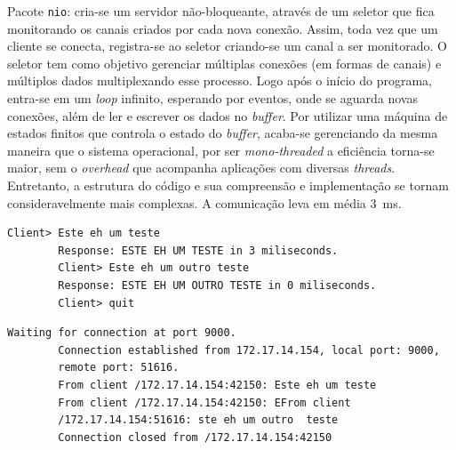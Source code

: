 \documentclass[a4paper, 12pt, answers]{exam}
\begin{document}
\begin{questions}
\begin{parts}
\begin{solution}
        Pacote \verb|nio|: cria-se um servidor não-bloqueante, através de um seletor 
        que fica monitorando os canais criados por cada nova conexão. Assim, toda vez
        que um cliente se conecta, registra-se ao seletor criando-se um canal a ser
        monitorado. O seletor tem como objetivo gerenciar múltiplas conexões (em 
        formas de canais) e múltiplos dados multiplexando esse processo.
        Logo após o início do programa, entra-se em um \emph{loop} infinito, 
        esperando por eventos, onde se aguarda novas conexões, além de ler e 
        escrever os dados no \emph{buffer}. Por utilizar uma máquina de estados
        finitos que controla o estado do \emph{buffer}, acaba-se gerenciando 
        da mesma maneira que o sistema operacional, por ser \emph{mono-threaded} 
        a eficiência torna-se maior, sem o \emph{overhead} que acompanha aplicações
        com diversas \emph{threads}. Entretanto, a estrutura do código e sua 
        compreensão e implementação se tornam consideravelmente mais complexas.
        A comunicação leva em média \SI{3}{\milli\second}.
        
        \vspace{.05em}
        \begin{Verbatim}[label={\$ java client.TCPClient}]
        Client> Este eh um teste
        Response: ESTE EH UM TESTE in 3 miliseconds.
        Client> Este eh um outro teste
        Response: ESTE EH UM OUTRO TESTE in 0 miliseconds.
        Client> quit
        \end{Verbatim}
        
        \vspace{.01em}
        \begin{Verbatim}[label={\$ java nio.TCPServer}]
        Waiting for connection at port 9000.
        Connection established from 172.17.14.154, local port: 9000, 
        remote port: 51616.
        From client /172.17.14.154:42150: Este eh um teste
        From client /172.17.14.154:42150: EFrom client 
        /172.17.14.154:51616: ste eh um outro  teste
        Connection closed from /172.17.14.154:42150
        \end{Verbatim}
        

\end{solution}
\end{parts}
\end{questions}
\end{document}
